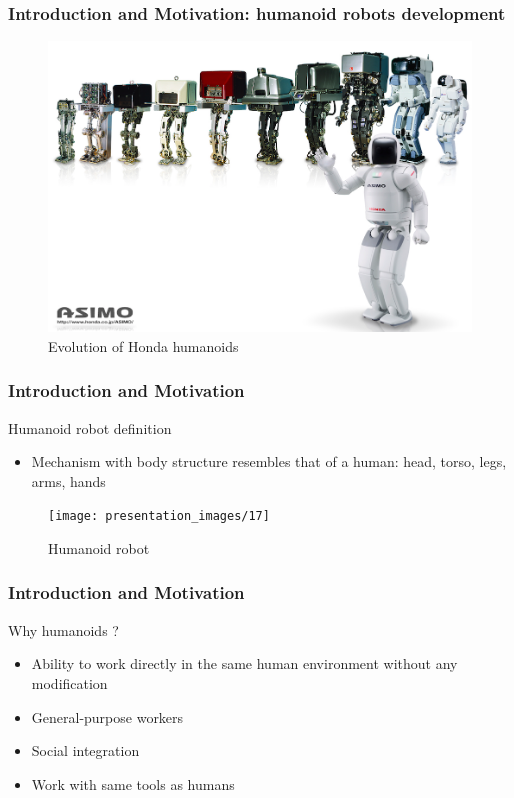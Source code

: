 \documentclass{beamer}
\begin{document}

	\begin{frame}
		\frametitle{Introduction and Motivation: humanoid robots development}
		\begin{figure}[h!]
			\includegraphics[width=0.8\linewidth]{presentation_images/6}
			\caption{Evolution of Honda humanoids}
		\end{figure}
	\end{frame}
	

	\begin{frame}
		\frametitle{Introduction and Motivation}
		\begin{block}{Humanoid robot definition}
			\begin{itemize}
				\item
					Mechanism with body structure resembles that of a human: head, torso, legs, arms, hands \cite{hirai1998development}
			\end{itemize}
		\end{block}
		\begin{figure}[h!]
			\begin{minipage}[H]{\linewidth}
				\centering
				\texttt{[image: presentation\_images/17]}
				\caption{Humanoid robot}
			\end{minipage}
		\end{figure}
	\end{frame}
	

	\begin{frame}
		\frametitle{Introduction and Motivation}
		\begin{block}{Why humanoids ?}
			\begin{itemize}
				\item
				Ability to work directly in the same human environment without any modification
				\item
				General-purpose workers
				\item
				Social integration
				\item
				Work with same tools as humans
			\end{itemize}
		\end{block}
	\end{frame}
	
\end{document}
